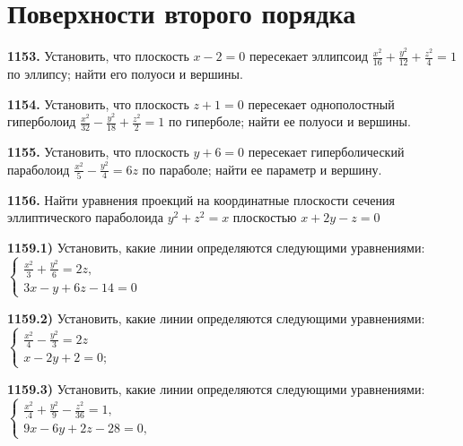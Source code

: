 \section{Поверхности второго порядка}



\textbf{1153.} Установить, что плоскость $x-2=0$ пересекает эллипсоид $\frac{x^2}{16}+\frac{y^2}{12}+\frac{z^2}{4}=1$ по эллипсу; найти его полуоси и вершины.

\textbf{1154.} Установить, что плоскость $z+1=0$ пересекает однополостный гиперболоид $\frac{x^2}{32}-\frac{y^2}{18}+\frac{z^2}{2}=1$ по гиперболе; найти ее полуоси и вершины.

\textbf{1155.} Установить, что плоскость $y+6=0$ пересекает гиперболический параболоид $\frac{x^2}{5}-\frac{y^2}{4}=6 z$ по параболе; найти ее параметр и вершину.

\textbf{1156.} Найти уравнения проекций на координатные плоскости сечения эллиптического параболоида $y^2+z^2=x$ плоскостью $x+2 y-z=0$

\textbf{1159.1)} Установить, какие линии определяются следующими уравнениями: $\left\{\begin{array}{l}\frac{x^2}{3}+\frac{y^2}{6}=2 z, \\ 3 x-y+6 z-14=0\end{array}\right.$

\textbf{1159.2)} Установить, какие линии определяются следующими уравнениями: $\left\{\begin{array}{l}\frac{x^2}{4}-\frac{y^2}{3}=2 z \\ x-2 y+2=0 ;\end{array}\right.$

\textbf{1159.3)} Установить, какие линии определяются следующими уравнениями: $\left\{\begin{array}{l}\frac{x^2}{.4}+\frac{y^2}{9}-\frac{z^2}{36}=1, \\ 9 x-6 y+2 z-28=0,\end{array}\right.$